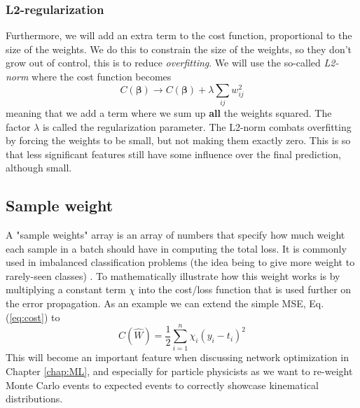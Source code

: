 \documentclass[12pt, a4paper]{book}
\begin{document}
\subsubsection*{L2-regularization}
Furthermore, we will add an extra term to the cost function, proportional to the size of the weights. We do this to constrain the size of the weights, so they don't grow out of control, 
this is to reduce \textit{overfitting}. We will use the so-called \textit{L2-norm} where the cost function becomes
\begin{equation}\label{eq:L2-reg}
    C(\bm\beta)\rightarrow C(\bm\beta)+\lambda\sum_{ij}w_{ij}^2
\end{equation}
meaning that we add a term where we sum up \textbf{all} the weights squared. The factor $\lambda$ is called the regularization parameter. The L2-norm combats overfitting by forcing the weights to be small, but not making them exactly zero. 
This is so that less significant features still have some influence over the final prediction, although small.


\subsection{Sample weight}\label{sec:sample_weight}
A "sample weights" array is an array of numbers that specify how much weight each sample in a batch should have in computing the total loss. 
It is commonly used in imbalanced classification problems (the idea being to give more weight to rarely-seen classes) \cite{tf_sample_wgt}. To mathematically illustrate how this 
weight works is by multiplying a constant term $\chi$ into the cost/loss function that is used further on the error propagation. As an example we can extend the simple MSE, Eq. (\ref{eq:cost}) to
\begin{equation}\label{eq:sample_weight}
    C(\hat{W})=\frac{1}{2}\sum_{i=1}^n\chi_i(y_i-t_i)^2
\end{equation}
This will become an important feature when discussing network optimization in Chapter \ref{chap:ML}, and especially for particle physicists as we want to re-weight Monte Carlo events to expected events to correctly showcase kinematical distributions.
\end{document}
